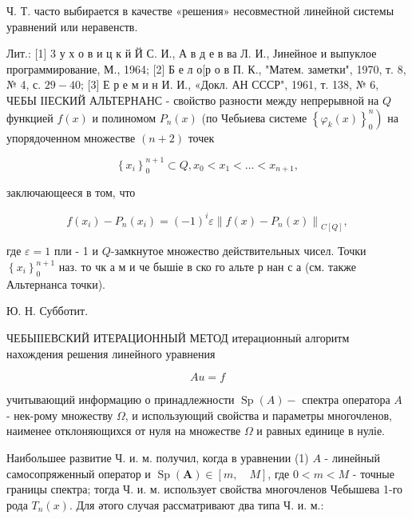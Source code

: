 \documentclass[10pt]{article}
\begin{document}
Ч. Т. часто выбирается в качестве «решения» несовместной линейной системы уравнений или неравенств.



Лит.: [1] 3 у х о в и ц к й Й С. И., А в д е в ва Л. И., Јинейное и выпуклое программирование, М., 1964; [2] Б е л о[р о в П. К., "Матем. заметки", 1970, т. 8, № 4, с. $29-40$; [3] Е р е м и н И. И., «Докл. АН СССР", 1961, т. 138, № 6, ЧЕБЫ ІІЕСКИЙ АЛЬТЕРНАНС - свойство разности между непрерывной на $Q$ функцией $f(x)$ и полиномом $P_{n}(x)$ (по Чебьиева системе $\left.\left\{\varphi_{k}(x)\right\}_{0}^{n}\right)$ на упорядоченном множестве $(n+2)$ точек



\[

\left\{x_{i}\right\}_{0}^{n+1} \subset Q, x_{0}<x_{1}<\ldots<x_{n+1},

\]



заключающееся в том, что



\[

f\left(x_{i}\right)-P_{n}\left(x_{i}\right)=(-1)^{i} \varepsilon\left\|f(x)-P_{n}(x)\right\|_{C[Q]},

\]



где $\varepsilon=1$ пли - 1 и $Q$-замкнутое множество действительных чисел. Точки $\left\{x_{i}\right\}_{0}^{n+1}$ наз. то чк а м и че бышіе в ско го альте р нан с а (см. также Альтернанса точки).



Ю. Н. Субботит.



ЧЕБЫІІЕВСКИЙ ИТЕРАЦИОННЫЙ МЕТОД итерационныӥ алгоритм нахождения решения линейного уравнения



\[

A u=f

\]



учитывающий информацию о принадлежности $\operatorname{Sp}(A)-$ спектра оператора $A$ - нек-рому множеству $\Omega$, и использующий свойства и параметры многочленов, наименее отклоняющихся от нуля на множестве $\Omega$ и равных единице в нуліе.



Наибольшее развитие Ч. и. м. получил, когда в уравнении (1) $A$ - линейный самосопряженный оператор и $\operatorname{Sp}(\boldsymbol{A}) \in[m, \quad M]$, где $0<m<M$ - точные границы спектра; тогда Ч. и. м. использует свойства многочленов Чебышева 1-го рода $T_{n}(x)$. Для әтого случая рассматривают два типа Ч. и. м.:
\end{document}

